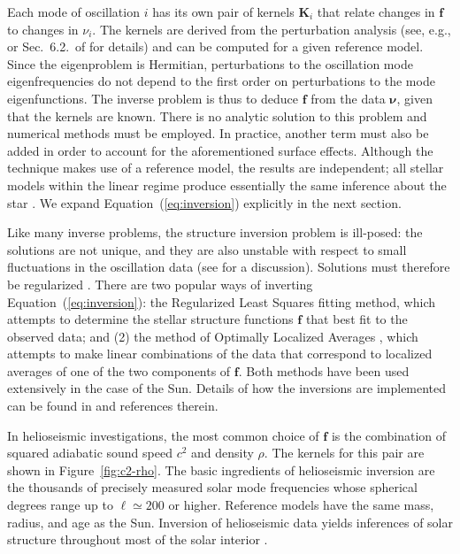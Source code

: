 Each mode of oscillation $i$ has its own pair of kernels $\mathbf {K}_i$ that relate changes in $\mathbf f$ to changes in $\nu_i$. 
The kernels are derived from the perturbation analysis (see, e.g., \citealt{GoughThompson1991} or Sec.~6.2.~of \citealt{2016lrsp...13....2b} for details) and can be computed for a given reference model. 
Since the eigenproblem is Hermitian, perturbations to the oscillation mode eigenfrequencies do not depend to the first order on perturbations to the mode eigenfunctions. 
The inverse problem is thus to deduce $\mathbf f$ from the data $\boldsymbol \nu$, given that the kernels are known. 
There is no analytic solution to this problem and numerical methods must be employed. 
In practice, another term must also be added in order to account for the aforementioned surface effects. 
Although the technique makes use of a reference model, the results are independent; all stellar models within the linear regime produce essentially the same inference about the star \citep{2000ApJ...529.1084B}. 
We expand Equation~(\ref{eq:inversion}) explicitly in the next section. 



Like many inverse problems, the structure inversion problem is ill-posed: the solutions are not unique, and they are also unstable with respect to small fluctuations in the oscillation data (see \citealt{GoughThompson1991} for a discussion). 
Solutions must therefore be regularized \citep[for a review of statistical regularization, see, e.g.,][]{tenorio2001statistical}. 
There are two popular ways of inverting Equation~(\ref{eq:inversion}): the Regularized Least Squares \citep[RLS;][]{tikhonov1977solutions} fitting method, which attempts to determine the stellar structure functions $\mathbf f$ that best fit to the observed data; and (2) the method of Optimally Localized Averages \citep[OLA;][]{1968GeoJ...16..169B}, which attempts to make linear combinations of the data that correspond to localized averages of one of the two components of $\mathbf f$. 
Both methods have been used extensively in the case of the Sun.
Details of how the inversions are implemented can be found in \citealt{2016lrsp...13....2b} and references therein.  


In helioseismic investigations, the most common choice of $\mathbf f$ is the combination of squared adiabatic sound speed $c^2$ and density $\rho$.
The kernels for this pair are shown in Figure~\ref{fig:c2-rho}. 
The basic ingredients of helioseismic inversion are the thousands of precisely measured solar mode frequencies whose spherical degrees range up to ${\ell \simeq 200}$ or higher. 
Reference models have the same mass, radius, and age as the Sun. 
Inversion of helioseismic data yields inferences of solar structure throughout most of the solar interior \citep[see, e.g.,][]{2009ApJ...699.1403B}.  


